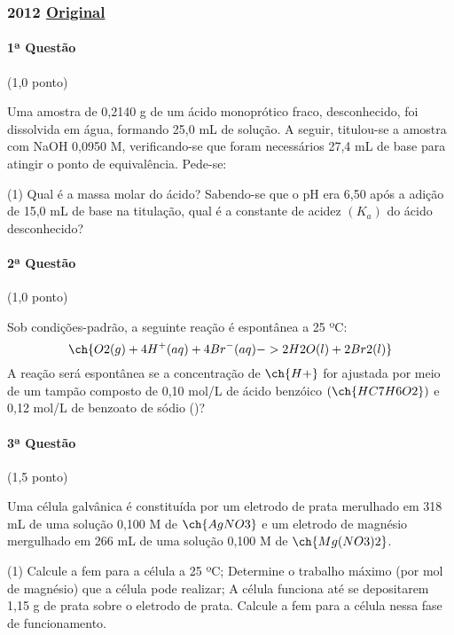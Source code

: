 \documentclass[12pt,a4paper]{article}
\newcommand{\original}[1]{\tiny \href{#1}{Original} \normalsize}
\begin{document}
\newpage

\subsubsection{2012 \original{https://drive.google.com/file/d/1ipD7tl7dx75HRWbsFW_bt3JJQ8HBmqCv/view?usp=sharing}}

\paragraph{1ª Questão} (1,0 ponto)

Uma amostra de 0,2140 g de um ácido monoprótico fraco, desconhecido, foi dissolvida em água, formando 25,0 mL de solução. A seguir, titulou-se a amostra com NaOH 0,0950 M, verificando-se que foram necessários 27,4 mL de base para atingir o ponto de equivalência. Pede-se:

\begin{tasks}(1)
\task Qual é a massa molar do ácido?
\task Sabendo-se que o pH era 6,50 após a adição de 15,0 mL de base na titulação, qual é a constante de acidez $(K_a)$ do ácido desconhecido?
\end{tasks}

\paragraph{2ª Questão} (1,0 ponto)

Sob condições-padrão, a seguinte reação é espontânea a 25 ºC:$$\ch{O2 (g) + 4 H^+ (aq) + 4 Br^- (aq) -> 2 H2O (l) + 2 Br2 (l)}$$A reação será espontânea se a concentração de $\ch{H+}$ for ajustada por meio de um tampão composto de 0,10 mol/L de ácido benzóico $(\ch{HC7H6O2})$ e 0,12 mol/L de benzoato de sódio ()?

\paragraph{3ª Questão} (1,5 ponto) 

Uma célula galvânica é constituída por um eletrodo de prata merulhado em 318 mL de uma solução 0,100 M de $\ch{AgNO3}$ e um eletrodo de magnésio mergulhado em 266 mL de uma solução 0,100 M de $\ch{Mg(NO3)2}$.
\begin{tasks}(1)
\task Calcule a fem para a célula a 25 ºC;
\task Determine o trabalho máximo (por mol de magnésio) que a célula pode realizar;
\task A célula funciona até se depositarem 1,15 g de prata sobre o eletrodo de prata. Calcule a fem para a célula nessa fase de funcionamento.
\end{tasks}
\end{document}
